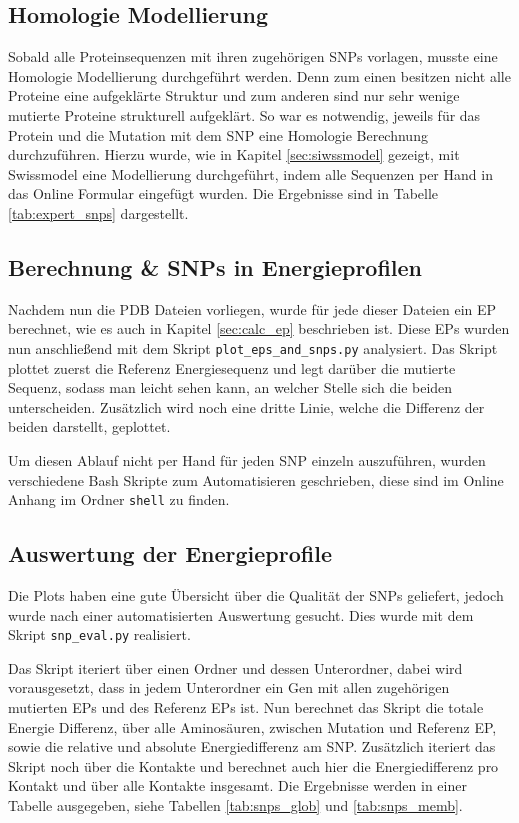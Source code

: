 \subsection{Homologie Modellierung}
Sobald alle Proteinsequenzen mit ihren zugehörigen \ac{SNP}s vorlagen, musste eine Homologie Modellierung durchgeführt werden. Denn zum einen besitzen nicht alle Proteine eine aufgeklärte Struktur und zum anderen sind nur sehr wenige mutierte Proteine strukturell aufgeklärt. So war es notwendig, jeweils für das Protein und die Mutation mit dem \ac{SNP} eine Homologie Berechnung durchzuführen. Hierzu wurde, wie in Kapitel \ref{sec:siwssmodel} gezeigt, mit Swissmodel eine Modellierung durchgeführt, indem alle Sequenzen per Hand in das Online Formular eingefügt wurden. Die Ergebnisse sind in Tabelle \ref{tab:expert_snps} dargestellt.


\subsection{Berechnung \& SNPs in Energieprofilen}
\label{sec:plot_eps}
Nachdem nun die \ac{PDB} Dateien vorliegen, wurde für jede dieser Dateien ein \ac{EP} berechnet, wie es auch in Kapitel \ref{sec:calc_ep} beschrieben ist. Diese \ac{EP}s wurden nun anschließend mit dem Skript \texttt{plot\_eps\_and\_snps.py} analysiert. Das Skript plottet zuerst die Referenz Energiesequenz und legt darüber die mutierte Sequenz, sodass man leicht sehen kann, an welcher Stelle sich die beiden unterscheiden. Zusätzlich wird noch eine dritte Linie, welche die Differenz der beiden darstellt, geplottet.

Um diesen Ablauf nicht per Hand für jeden \ac{SNP} einzeln auszuführen, wurden verschiedene Bash Skripte zum Automatisieren geschrieben, diese sind im Online Anhang im Ordner \texttt{shell} zu finden.


\subsection{Auswertung der Energieprofile}
\label{sec:auswertung_eps}
Die Plots haben eine gute Übersicht über die Qualität der \ac{SNP}s geliefert, jedoch wurde nach einer automatisierten Auswertung gesucht. Dies wurde mit dem Skript \texttt{snp\_eval.py} realisiert.

Das Skript iteriert über einen Ordner und dessen Unterordner, dabei wird vorausgesetzt, dass in jedem Unterordner ein Gen mit allen zugehörigen mutierten \ac{EP}s und des Referenz \ac{EP}s ist. Nun berechnet das Skript die totale Energie Differenz, über alle Aminosäuren, zwischen Mutation und Referenz \ac{EP}, sowie die relative und absolute Energiedifferenz am \ac{SNP}. Zusätzlich iteriert das Skript noch über die Kontakte und berechnet auch hier die Energiedifferenz pro Kontakt und über alle Kontakte insgesamt. Die Ergebnisse werden in einer Tabelle ausgegeben, siehe Tabellen \ref{tab:snps_glob} und \ref{tab:snps_memb}.


